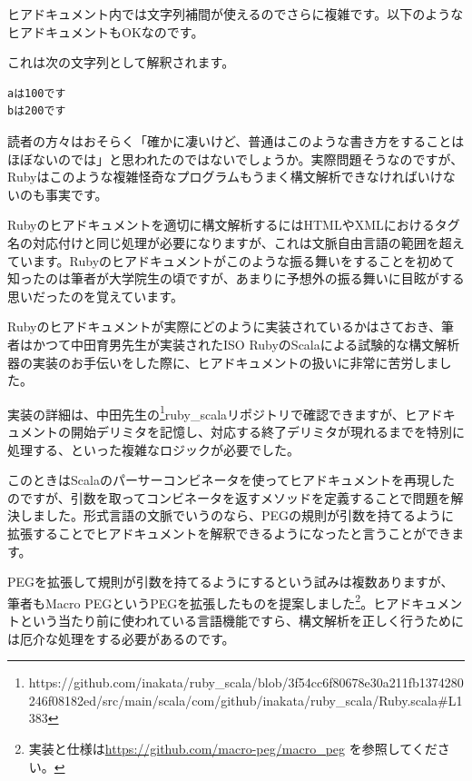 ヒアドキュメント内では文字列補間が使えるのでさらに複雑です。以下のようなヒアドキュメントもOKなのです。

\begin{Shaded}
\begin{Highlighting}[]
\end{Highlighting}
\end{Shaded}

これは次の文字列として解釈されます。

\begin{verbatim}
aは100です
bは200です
\end{verbatim}

読者の方々はおそらく「確かに凄いけど、普通はこのような書き方をすることはほぼないのでは」と思われたのではないでしょうか。実際問題そうなのですが、Rubyはこのような複雑怪奇なプログラムもうまく構文解析できなければいけないのも事実です。

Rubyのヒアドキュメントを適切に構文解析するにはHTMLやXMLにおけるタグ名の対応付けと同じ処理が必要になりますが、これは文脈自由言語の範囲を超えています。Rubyのヒアドキュメントがこのような振る舞いをすることを初めて知ったのは筆者が大学院生の頃ですが、あまりに予想外の振る舞いに目眩がする思いだったのを覚えています。

Rubyのヒアドキュメントが実際にどのように実装されているかはさておき、筆者はかつて中田育男先生が実装されたISO
RubyのScalaによる試験的な構文解析器の実装のお手伝いをした際に、ヒアドキュメントの扱いに非常に苦労しました。

実装の詳細は、中田先生の\footnote{https://github.com/inakata/ruby\_scala/blob/3f54cc6f80678e30a211fb1374280246f08182ed/src/main/scala/com/github/inakata/ruby\_scala/Ruby.scala\#L1383}{ruby\_scalaリポジトリ}で確認できますが、ヒアドキュメントの開始デリミタを記憶し、対応する終了デリミタが現れるまでを特別に処理する、といった複雑なロジックが必要でした。

このときはScalaのパーサーコンビネータを使ってヒアドキュメントを再現したのですが、引数を取ってコンビネータを返すメソッドを定義することで問題を解決しました。形式言語の文脈でいうのなら、PEGの規則が引数を持てるように拡張することでヒアドキュメントを解釈できるようになったと言うことができます。

PEGを拡張して規則が引数を持てるようにするという試みは複数ありますが、筆者もMacro
PEGというPEGを拡張したものを提案しました\footnote{実装と仕様は\url{https://github.com/macro-peg/macro_peg}
  を参照してください。}。ヒアドキュメントという当たり前に使われている言語機能ですら、構文解析を正しく行うためには厄介な処理をする必要があるのです。

